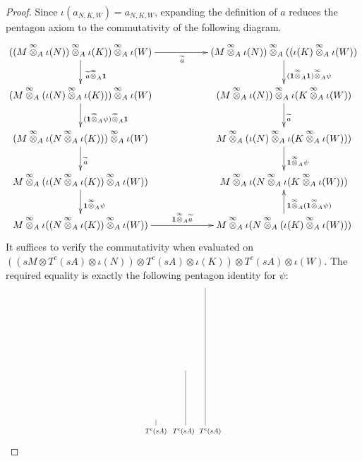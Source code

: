 \documentclass[a4paper, 11pt]{amsart}
\newcommand{\tikzmath}[2][]
{\vcenter{\hbox{\scalebox{0.7}{\begin{tikzpicture}[#1]#2\end{tikzpicture}}}}
}
\theoremstyle{definition}
\theoremstyle{remark}
\numberwithin{equation}{section}
\newcommand{\id}{\mathbf{1}}
\begin{document}
\begin{proof}
Since $\iota(a_{N,K,W})=a_{N,K,W}$, expanding the definition of $a$ reduces the pentagon axiom to the commutativity of the following diagram.
\[
\xymatrix{
((M\overset{\infty}{\otimes}_A \iota(N)) \overset{\infty}{\otimes}_A \iota(K))\overset{\infty}{\otimes}_A \iota(W)\ar[d]^{\; \widetilde a\overset{\infty}{\otimes}_A \id}\ar[rr]_{\widetilde a} & & (M\overset{\infty}{\otimes}_A \iota(N))\overset{\infty}{\otimes}_A ((\iota(K)\overset{\infty}{\otimes}_A \iota(W))\ar[d]^{(\id\overset{\infty}{\otimes}_A \id)\overset{\infty}{\otimes}_A \psi} \\
(M\overset{\infty}{\otimes}_A ( \iota(N)\overset{\infty}{\otimes}_A \iota(K))) \overset{\infty}{\otimes}_A \iota(W)\ar[d]^{(\id\overset{\infty}{\otimes}_A \psi)\overset{\infty}{\otimes}_A\id} & & (M\overset{\infty}{\otimes}_A \iota(N))\overset{\infty}{\otimes}_A \iota(K\overset{\infty}{\otimes}_A \iota(W))\ar[d]^{\widetilde{a}} \\
(M\overset{\infty}{\otimes}_A \iota(N\overset{\infty}{\otimes}_A \iota(K)))\overset{\infty}{\otimes}_A \iota(W)\ar[d]^{\widetilde{a}} & & M\overset{\infty}{\otimes}_A (\iota(N)\overset{\infty}{\otimes}_A \iota(K\overset{\infty}{\otimes}_A \iota(W))) \ar[d]^{\id\overset{\infty}{\otimes}_A \psi} \\
M\overset{\infty}{\otimes}_A (\iota(N\overset{\infty}{\otimes}_A \iota(K))\overset{\infty}{\otimes}_A \iota(W))\ar[d]^{\id\overset{\infty}{\otimes}_A \psi} & &M\overset{\infty}{\otimes}_A \iota(N\overset{\infty}{\otimes}_A \iota(K\overset{\infty}{\otimes}_A \iota(W))) \\
M\overset{\infty}{\otimes}_A \iota((N\overset{\infty}{\otimes}_A \iota(K))\overset{\infty}{\otimes}_A \iota(W))\ar[rr]^{\id\overset{\infty}{\otimes}_A \widetilde{a}} & & M\overset{\infty}{\otimes}_A \iota(N\overset{\infty}{\otimes}_A (\iota(K)\overset{\infty}{\otimes}_A \iota(W)))\ar[u]_{\id\overset{\infty}{\otimes}_A (\id \overset{\infty}{\otimes}_A \psi)}
 }
\]
It suffices to verify the commutativity when evaluated on $((sM\otimes T^c(sA)\otimes \iota(N))\otimes T^c(sA)\otimes \iota(K))\otimes T^c(sA)\otimes \iota(W)$. The required equality is exactly the following pentagon identity for $\psi$:
\begin{equation}\label{equation:associativity}
\tikzmath{
\draw (-1.5, 0) --(-1.5, .3);
\draw (0, 0) --(0, 2.8);
\draw (1, 0) --(1, 7);
\node at (-1.5, -.3) {$T^c(sA)$};
\node at (-.1, -.3) {$T^c(sA)$};
\node at (1.25, -.3) {$T^c(sA)$};

}
\end{equation}
\end{proof}
\end{document}

